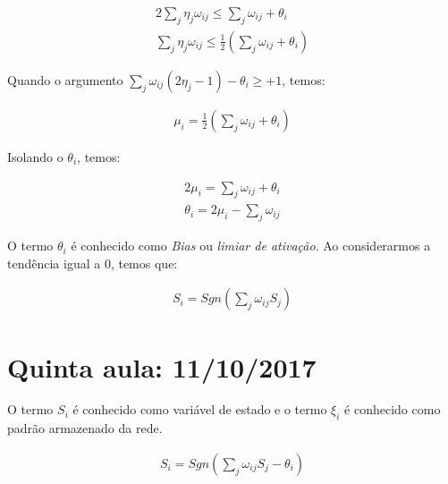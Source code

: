\begin{tcolorbox}[colback=white!5,colframe=white!40!black,title= Continuação...]
	
	\begin{eqnarray*}	
		2 \sum_j \eta_j \omega_{ij}  \leq \sum_j \omega_{ij} +  \theta_i  \\	
		\sum_j \eta_j \omega_{ij} \leq \frac{1}{2} \left( \sum_j \omega_{ij} + \theta_i \right)
	\end{eqnarray*}
	
	Quando o argumento $\sum\limits_{j} \omega_{ij} (2\eta_{j}-1)-\theta_{i} \geq +1$, temos:
	
   \begin{eqnarray*}	
          \mu_{i}= \frac{1}{2} \left( \sum_j \omega_{ij} + \theta_i \right)
   \end{eqnarray*}
	
	Isolando o $\theta_{i}$, temos:
	
	   \begin{eqnarray*}	
	    2 \mu_{i}=   \sum_j \omega_{ij} + \theta_i \\
	    \theta_{i} = 2 \mu_{i} -  \sum_j \omega_{ij}
	   \end{eqnarray*}
	
	O termo $\theta_{i}$ é conhecido como \textit{Bias} ou \textit{limiar de ativação}. Ao considerarmos a tendência igual a $0$, temos que:
	
	\begin{eqnarray*}	
		S_{i}= Sgn (\sum\limits_{j} \omega_{ij} S_{j})
	\end{eqnarray*}
\end{tcolorbox}

\pagebreak
\section{Quinta aula: 11/10/2017}
 
 O termo $S_{i}$ é conhecido como variável de estado e o termo $\xi_{i}$ é conhecido como padrão armazenado da rede. 
 
 	\begin{eqnarray*}	
 		S_{i}= Sgn (\sum\limits_{j} \omega_{ij} S_{j}- \theta_{i})
 	\end{eqnarray*} 

\pagebreak
 
 


